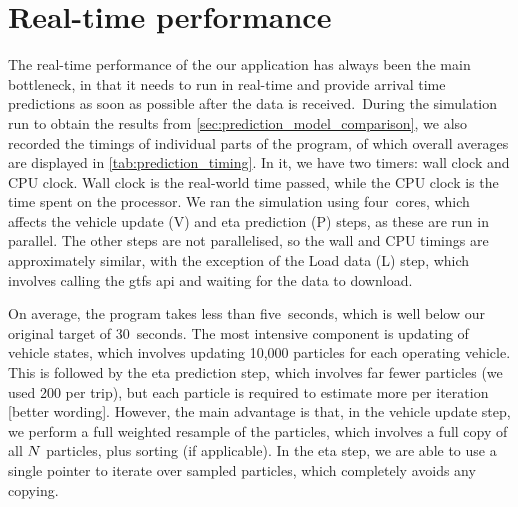 \section{Real-time performance}
\label{sec:prediction_performance}

The real-time performance of the our application has always been the main bottleneck, in that it needs to run in real-time and provide arrival time predictions as soon as possible after the data is received. During the simulation run to obtain the results from \cref{sec:prediction_model_comparison}, we also recorded the timings of individual parts of the program, of which overall averages are displayed in \cref{tab:prediction_timing}. In it, we have two timers: wall clock and CPU clock. Wall clock is the real-world time passed, while the CPU clock is the time spent on the processor.  We ran the simulation using four~cores, which affects the vehicle update (V) and \gls{eta} prediction (P) steps, as these are run in parallel. The other steps are not parallelised, so the wall and CPU timings are approximately similar, with the exception of the Load data (L) step, which involves calling the \gls{gtfs} \gls{api} and waiting for the data to download.


On average, the program takes less than five~seconds, which is well below our original target of 30~seconds. The most intensive component is updating of vehicle states, which involves updating 10,000 particles for each operating vehicle. This is followed by the \gls{eta} prediction step, which involves far fewer particles (we used 200 per trip), but each particle is required to estimate more per iteration [better wording]. However, the main advantage is that, in the vehicle update step, we perform a full weighted resample of the particles, which involves a full copy of all $N$ particles, plus sorting (if applicable). In the \gls{eta} step, we are able to use a single pointer to iterate over sampled particles, which completely avoids any copying.


